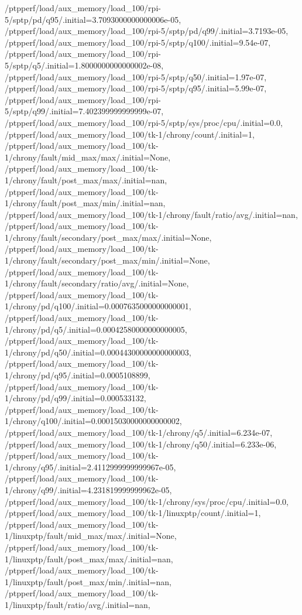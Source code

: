 {    /ptpperf/load/aux_memory/load_100/rpi-5/sptp/pd/q95/.initial=3.7093000000000006e-05,
    /ptpperf/load/aux_memory/load_100/rpi-5/sptp/pd/q99/.initial=3.7193e-05,
    /ptpperf/load/aux_memory/load_100/rpi-5/sptp/q100/.initial=9.54e-07,
    /ptpperf/load/aux_memory/load_100/rpi-5/sptp/q5/.initial=1.8000000000000002e-08,
    /ptpperf/load/aux_memory/load_100/rpi-5/sptp/q50/.initial=1.97e-07,
    /ptpperf/load/aux_memory/load_100/rpi-5/sptp/q95/.initial=5.99e-07,
    /ptpperf/load/aux_memory/load_100/rpi-5/sptp/q99/.initial=7.402399999999999e-07,
    /ptpperf/load/aux_memory/load_100/rpi-5/sptp/sys/proc/cpu/.initial=0.0,
    /ptpperf/load/aux_memory/load_100/tk-1/chrony/count/.initial=1,
    /ptpperf/load/aux_memory/load_100/tk-1/chrony/fault/mid_max/max/.initial=None,
    /ptpperf/load/aux_memory/load_100/tk-1/chrony/fault/post_max/max/.initial=nan,
    /ptpperf/load/aux_memory/load_100/tk-1/chrony/fault/post_max/min/.initial=nan,
    /ptpperf/load/aux_memory/load_100/tk-1/chrony/fault/ratio/avg/.initial=nan,
    /ptpperf/load/aux_memory/load_100/tk-1/chrony/fault/secondary/post_max/max/.initial=None,
    /ptpperf/load/aux_memory/load_100/tk-1/chrony/fault/secondary/post_max/min/.initial=None,
    /ptpperf/load/aux_memory/load_100/tk-1/chrony/fault/secondary/ratio/avg/.initial=None,
    /ptpperf/load/aux_memory/load_100/tk-1/chrony/pd/q100/.initial=0.0007635000000000001,
    /ptpperf/load/aux_memory/load_100/tk-1/chrony/pd/q5/.initial=0.00042580000000000005,
    /ptpperf/load/aux_memory/load_100/tk-1/chrony/pd/q50/.initial=0.00044300000000000003,
    /ptpperf/load/aux_memory/load_100/tk-1/chrony/pd/q95/.initial=0.0005108899,
    /ptpperf/load/aux_memory/load_100/tk-1/chrony/pd/q99/.initial=0.000533132,
    /ptpperf/load/aux_memory/load_100/tk-1/chrony/q100/.initial=0.00015030000000000002,
    /ptpperf/load/aux_memory/load_100/tk-1/chrony/q5/.initial=6.234e-07,
    /ptpperf/load/aux_memory/load_100/tk-1/chrony/q50/.initial=6.233e-06,
    /ptpperf/load/aux_memory/load_100/tk-1/chrony/q95/.initial=2.4112999999999967e-05,
    /ptpperf/load/aux_memory/load_100/tk-1/chrony/q99/.initial=4.231819999999962e-05,
    /ptpperf/load/aux_memory/load_100/tk-1/chrony/sys/proc/cpu/.initial=0.0,
    /ptpperf/load/aux_memory/load_100/tk-1/linuxptp/count/.initial=1,
    /ptpperf/load/aux_memory/load_100/tk-1/linuxptp/fault/mid_max/max/.initial=None,
    /ptpperf/load/aux_memory/load_100/tk-1/linuxptp/fault/post_max/max/.initial=nan,
    /ptpperf/load/aux_memory/load_100/tk-1/linuxptp/fault/post_max/min/.initial=nan,
    /ptpperf/load/aux_memory/load_100/tk-1/linuxptp/fault/ratio/avg/.initial=nan,
}
